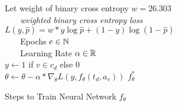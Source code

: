 \begin{algorithm}[ht]
    \DontPrintSemicolon
  
  
    Let weight of binary cross entropy $w = 26.303$\\
    $\:\:\:\:\:\:\:$ \textit{weighted binary cross entropy loss} $L(y,\hat{p}) = w*y\log{\hat{p} + (1-y)\log{(1-\hat{p})}}$\\
    $\:\:\:\:\:\:\:$ Epochs $e \in \Bbb N$\\
    $\:\:\:\:\:\:\:$ Learning Rate $\alpha \in \Bbb R$\\
  
     {
       {
        $y \gets 1$ if $v \in c_d$ else 0\\
        $\theta \gets \theta - \alpha * \nabla_{\theta}L(y, f_\theta(t_d, a_v))$
      }
    }
     $f_\theta^*$
    \caption{Steps to Train Neural Network $f_\theta$}
    \label{algo:fit-dnn}
  \end{algorithm}